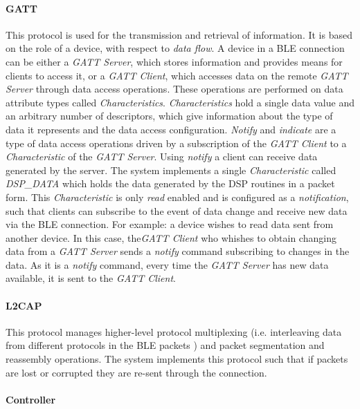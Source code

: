 \paragraph{GATT}
This protocol is used for the transmission and retrieval of information. It is based on the role of a device, with respect to \textit{data flow}. A device in a BLE connection can be either a \textit{GATT Server}, which stores information and provides means for clients to access it, or a \textit{GATT Client}, which accesses data on the remote \textit{GATT Server} through data access operations. These operations are performed on data attribute types called \textit{Characteristics}. \textit{Characteristics} hold a single data value and an arbitrary number of descriptors, which give information about the type of data it represents and the data access configuration. \textit{Notify} and \textit{indicate} are a type of data access operations driven by a subscription of the \textit{GATT Client} to a \textit{Characteristic} of the \textit{GATT Server}. Using \textit{notify} a client can receive data generated by the server. The system implements a single \textit{Characteristic} called \textit{DSP\_DATA} which holds the data generated by the DSP routines in a packet form. This \textit{Characteristic} is only \textit{read} enabled and is configured as a \textit{notification}, such that clients can subscribe to the event of data change and receive new data via the BLE connection. For example: a device wishes to read data sent from another device. In this case, the\textit{GATT Client} who whishes to obtain changing data from a \textit{GATT Server} sends a \textit{notify} command subscribing to changes in the data. As it is a \textit{notify} command, every time the \textit{GATT Server} has new data available, it is sent to the \textit{GATT Client}.

\paragraph{L2CAP}
This protocol manages higher-level protocol multiplexing (i.e. interleaving data from different protocols in the BLE packets \cite{Blel2cap}) and packet segmentation and reassembly operations. The system implements this protocol such that if packets are lost or corrupted they are re-sent through the connection.

\paragraph{Controller}

